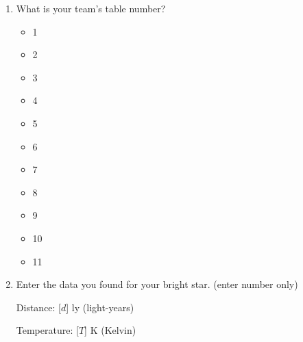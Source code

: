 \documentclass[12pt]{article}
\begin{document}
\begin{enumerate}
\item
What is your team's table number?
\begin{itemize}
    \item 1
    \item 2
    \item 3
    \item 4
    \item 5
    \item 6
    \item 7
    \item 8
    \item 9
    \item 10
    \item 11
\end{itemize}
\item
Enter the data you found for your bright star. (enter number only)

Distance: [$d$] ly (light-years)

Temperature: [$T$] K (Kelvin)


\end{enumerate}
\end{document}
